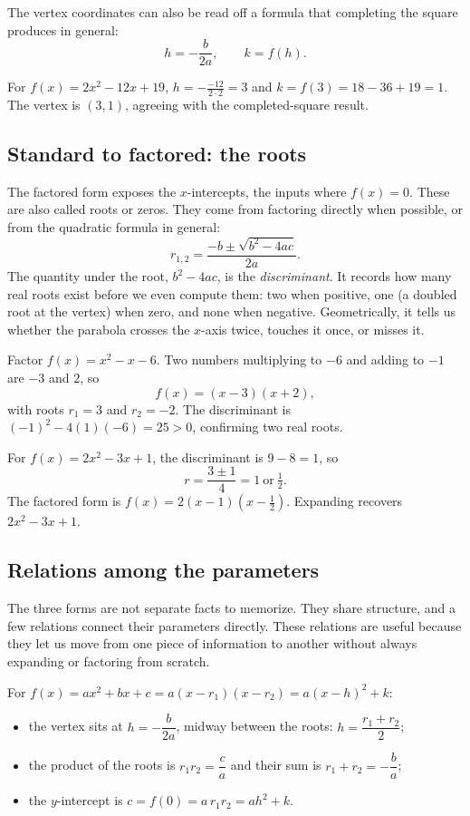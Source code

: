 \documentclass[12pt]{book}
\begin{document}
The vertex coordinates can also be read off a formula that completing the square
produces in general:
\[
h=-\frac{b}{2a},\qquad k=f(h).
\]

\begin{example}
For $f(x)=2x^2-12x+19$, $h=-\tfrac{-12}{2\cdot2}=3$ and $k=f(3)=18-36+19=1$. The
vertex is $(3,1)$, agreeing with the completed-square result.
\end{example}

\subsection{Standard to factored: the roots}

The factored form exposes the $x$-intercepts, the inputs where $f(x)=0$. These are
also called roots or zeros. They come from factoring directly when possible, or from
the quadratic formula in general:
\[
r_{1,2}=\frac{-b\pm\sqrt{b^2-4ac}}{2a}.
\]
The quantity under the root, $b^2-4ac$, is the \emph{discriminant}. It records how
many real roots exist before we even compute them: two when positive, one (a doubled
root at the vertex) when zero, and none when negative. Geometrically, it tells us
whether the parabola crosses the $x$-axis twice, touches it once, or misses it.
\begin{example}
Factor $f(x)=x^2-x-6$. Two numbers multiplying to $-6$ and adding to $-1$ are $-3$
and $2$, so
\[
f(x)=(x-3)(x+2),
\]
with roots $r_1=3$ and $r_2=-2$. The discriminant is $(-1)^2-4(1)(-6)=25>0$,
confirming two real roots.
\end{example}

\begin{example}
For $f(x)=2x^2-3x+1$, the discriminant is $9-8=1$, so
\[
r=\frac{3\pm1}{4}=1\ \text{or}\ \tfrac12.
\]
The factored form is $f(x)=2(x-1)\!\left(x-\tfrac12\right)$. Expanding recovers
$2x^2-3x+1$.
\end{example}

\subsection{Relations among the parameters}

The three forms are not separate facts to memorize. They share structure, and a few
relations connect their parameters directly. These relations are useful because they
let us move from one piece of information to another without always expanding or
factoring from scratch.
\begin{keyidea}
For $f(x)=ax^2+bx+c=a(x-r_1)(x-r_2)=a(x-h)^2+k$:
\begin{itemize}\setlength{\itemsep}{2pt}
  \item the vertex sits at $h=-\dfrac{b}{2a}$, midway between the roots:
        $h=\dfrac{r_1+r_2}{2}$;
  \item the product of the roots is $r_1r_2=\dfrac{c}{a}$ and their sum is
        $r_1+r_2=-\dfrac{b}{a}$;
  \item the $y$-intercept is $c=f(0)=a\,r_1r_2=a h^2+k$.
\end{itemize}
\end{keyidea}
\end{document}
